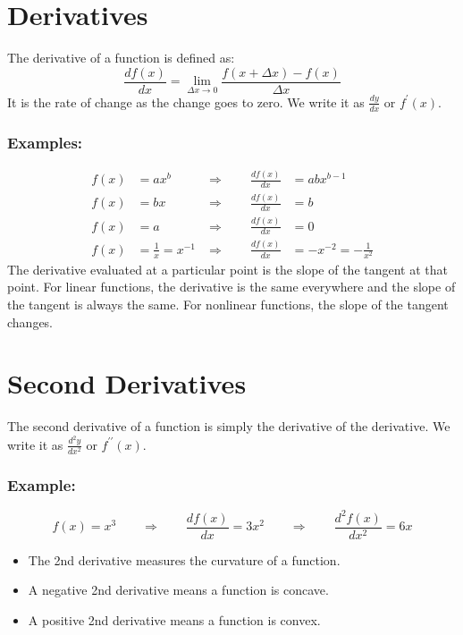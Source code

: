 \documentclass[10pt]{article}
\begin{document}
\section{Derivatives}
The derivative of a function is defined as:
  \begin{equation*}
    \frac{df\left( x \right)}{dx} = \underset{\Delta x \rightarrow 0}{\lim}\frac{f\left( x+\Delta x \right)- f\left( x \right)}{\Delta x}
  \end{equation*}
  It is the rate of change as the change goes to zero. We write it as $\frac{dy}{dx}$ or $f^\prime\left( x \right)$.
\subsubsection*{Examples:}
\begin{align*}
  f\left( x \right)&= a x^b
  & \Longrightarrow\qquad
  \frac{df\left( x \right)}{dx} &= abx^{b-1} \\
  f\left( x \right)&= bx
  & \Longrightarrow\qquad
  \frac{df\left( x \right)}{dx} &= b \\
  f\left( x \right)&= a
  & \Longrightarrow\qquad
  \frac{df\left( x \right)}{dx} &= 0 \\
  f\left( x \right)&= \frac{1}{x} =x^{-1}
  & \Longrightarrow\qquad
  \frac{df\left( x \right)}{dx} &= -x^{-2} = -\frac{1}{x^2}
\end{align*}
The derivative evaluated at a particular point is the slope of the tangent at that point.
For linear functions, the derivative is the same everywhere and the slope of the tangent is always the same. For nonlinear functions, the slope of the tangent changes.
\section{Second Derivatives}
The second derivative of a function is simply the derivative of the derivative. We write it as $\frac{d^2y}{dx^2}$ or $f^{\prime\prime}\left( x \right)$.
\subsubsection*{Example:}
\[
  f\left( x \right) = x^3   \qquad \Longrightarrow \qquad  \frac{df\left( x \right)}{dx} = 3x^2  \qquad \Longrightarrow \qquad  \frac{d^2f\left( x \right)}{dx^2} = 6x
\]
\begin{itemize}
  \item The 2nd derivative measures the curvature of a function.
  \item A negative 2nd derivative means a function is concave.
  \item A positive 2nd derivative means a function is convex.
\end{itemize}
\end{document}
